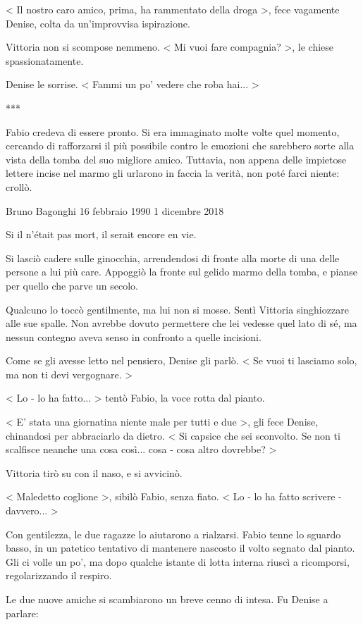 < Il nostro caro amico, prima, ha rammentato della droga >, fece vagamente Denise, colta da un'improvvisa ispirazione.

Vittoria non si scompose nemmeno. < Mi vuoi fare compagnia? >, le chiese spassionatamente.

Denise le sorrise. < Fammi un po' vedere che roba hai... >

***

Fabio credeva di essere pronto. Si era immaginato molte volte quel momento, cercando di rafforzarsi il più possibile contro le emozioni che sarebbero sorte alla vista della tomba del suo migliore amico. Tuttavia, non appena delle impietose lettere incise nel marmo gli urlarono in faccia la verità, non poté farci niente: crollò.

Bruno Bagonghi
16 febbraio 1990
1 dicembre 2018

Si il n'était pas mort, il serait encore en vie.

Si lasciò cadere sulle ginocchia, arrendendosi di fronte alla morte di una delle persone a lui più care. Appoggiò la fronte sul gelido marmo della tomba, e pianse per quello che parve un secolo.

Qualcuno lo toccò gentilmente, ma lui non si mosse. Sentì Vittoria singhiozzare alle sue spalle. Non avrebbe dovuto permettere che lei vedesse quel lato di sé, ma nessun contegno aveva senso in confronto a quelle incisioni.

Come se gli avesse letto nel pensiero, Denise gli parlò. < Se vuoi ti lasciamo solo, ma non ti devi vergognare. >

< Lo - lo ha fatto... > tentò Fabio, la voce rotta dal pianto.

< E' stata una giornatina niente male per tutti e due >, gli fece Denise, chinandosi per abbraciarlo da dietro. < Si capsice che sei sconvolto. Se non ti scalfisce neanche una cosa così... cosa - cosa altro dovrebbe? >

Vittoria tirò su con il naso, e si avvicinò.

< Maledetto coglione >, sibilò Fabio, senza fiato. < Lo - lo ha fatto scrivere - davvero... >

Con gentilezza, le due ragazze lo aiutarono a rialzarsi. Fabio tenne lo sguardo basso, in un patetico tentativo di mantenere nascosto il volto segnato dal pianto. Gli ci volle un po', ma dopo qualche istante di lotta interna riuscì a ricomporsi, regolarizzando il respiro.

Le due nuove amiche si scambiarono un breve cenno di intesa. Fu Denise a parlare:

